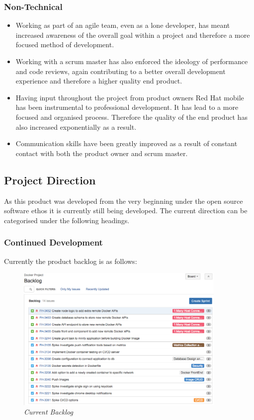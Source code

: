 \subsubsection{Non-Technical}
\begin{itemize}
	\item Working as part of an agile team, even as a lone developer, has meant increased awareness of the overall goal within a project and therefore a more focused method of development.
	\item Working with a scrum master has also enforced the ideology of performance and code reviews, again contributing to a better overall development experience and therefore a higher quality end product.
	\item Having input throughout the project from product owners Red Hat mobile has been instrumental to professional development. It has lead to a more focused and organised process. Therefore the quality of the end product has also increased exponentially as a result.
	\item Communication skills have been greatly improved as a result of constant contact with both the product owner and scrum master.
\end{itemize}

\newpage
\subsection{Project Direction}
As this product was developed from the very beginning under the open source software ethos it is currently still being developed. The current direction can be categorised under the following headings.

\subsubsection{Continued Development}
\label{subs:cont_dev}
Currently the product backlog is as follows:

\begin{figure}[!ht]
	\centering
	\includegraphics*[width=0.9\textwidth]{images/final_backlog}
	\caption{\em Current Backlog}
	\label{fig:final_backlog}
\end{figure}

